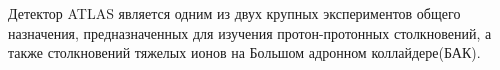 Детектор ATLAS является одним из двух крупных экспериментов общего назначения, предназначенных для изучения протон-протонных столкновений, а также столкновений тяжелых ионов на Большом адронном коллайдере(БАК).
